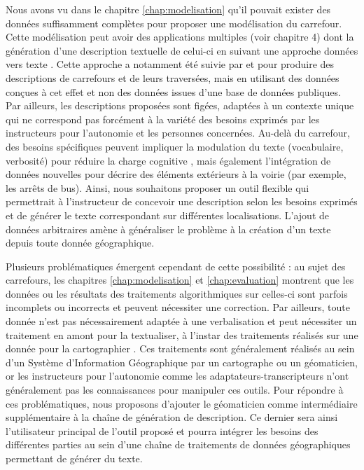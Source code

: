 Nous avons vu dans le chapitre \ref{chap:modelisation} qu’il pouvait exister des données suffisamment complètes pour proposer une modélisation du carrefour. Cette modélisation peut avoir des applications multiples (voir chapitre 4) dont la génération d’une description textuelle de celui-ci en suivant une approche données vers texte \cite{reiter-2007-architecture}. Cette approche a notamment été suivie par \missref{} et \missref{} pour produire des descriptions de carrefours et de leurs traversées, mais en utilisant des données conçues à cet effet et non des données issues d’une base de données publiques. Par ailleurs, les descriptions proposées sont figées, adaptées à un contexte unique qui ne correspond pas forcément à la variété des besoins exprimés par les instructeurs pour l’autonomie et les personnes concernées. Au-delà du carrefour, des besoins spécifiques peuvent impliquer la modulation du texte (vocabulaire, verbosité) pour réduire la charge cognitive \missref{}, mais également l’intégration de données nouvelles pour décrire des éléments extérieurs à la voirie (par exemple, les arrêts de bus). Ainsi, nous souhaitons proposer un outil flexible qui permettrait à l’instructeur de concevoir une description selon les besoins exprimés et de générer le texte correspondant sur différentes localisations. L’ajout de données arbitraires amène à généraliser le problème à la création d’un texte depuis toute donnée géographique.

\newpar{}

Plusieurs problématiques émergent cependant de cette possibilité : au sujet des carrefours, les chapitres \ref{chap:modelisation} et \ref{chap:evaluation} montrent que les données ou les résultats des traitements algorithmiques sur celles-ci sont parfois incomplets ou incorrects et peuvent nécessiter une correction. Par ailleurs, toute donnée n’est pas nécessairement adaptée à une verbalisation et peut nécessiter un traitement en amont pour la textualiser, à l’instar des traitements réalisés sur une donnée pour la cartographier \missref{}. Ces traitements sont généralement réalisés au sein d’un Système d’Information Géographique par un cartographe ou un géomaticien, or les instructeurs pour l’autonomie comme les adaptateurs-transcripteurs n’ont généralement pas les connaissances pour manipuler ces outils. Pour répondre à ces problématiques, nous proposons d’ajouter le géomaticien comme intermédiaire supplémentaire à la chaîne de génération de description. Ce dernier sera ainsi l’utilisateur principal de l’outil proposé et pourra intégrer les besoins des différentes parties au sein d’une chaîne de traitements de données géographiques permettant de générer du texte.

